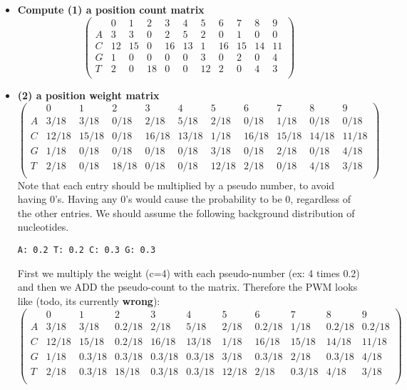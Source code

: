 \documentclass[a4paper,10pt,titlepage]{article}
\begin{document}
\begin{itemize}
\item
\textbf{Compute (1) a position count matrix} \\
\begin{equation}
  \begin{pmatrix}
	  & 0  & 1  & 2  & 3  & 4  & 5  & 6  & 7  & 8  & 9 \\
	\hline
	A & 3  & 3  & 0  & 2  & 5  & 2  & 0  & 1  & 0  & 0 \\
	C & 12 & 15 & 0  & 16 & 13 & 1  & 16 & 15 & 14 & 11\\
	G & 1  & 0  & 0  & 0  & 0  & 3  & 0  & 2  & 0  & 4 \\
	T & 2  & 0  & 18 & 0  & 0  & 12 & 2  & 0  & 4  & 3 \\
  \end{pmatrix}
\end{equation}

\item
\textbf{(2) a position weight matrix} \\
\begin{equation}
  \begin{pmatrix}
	  & 0  & 1  & 2  & 3  & 4  & 5  & 6  & 7  & 8  & 9 \\
	\hline
	A & 3/18  & 3/18  & 0/18  & 2/18  & 5/18  & 2/18  & 0/18  & 1/18  & 0/18  & 0/18 \\
	C & 12/18 & 15/18 & 0/18  & 16/18 & 13/18 & 1/18  & 16/18 & 15/18 & 14/18 & 11/18\\
	G & 1/18  & 0/18  & 0/18  & 0/18  & 0/18  & 3/18  & 0/18  & 2/18  & 0/18  & 4/18 \\
	T & 2/18  & 0/18  & 18/18 & 0/18  & 0/18  & 12/18 & 2/18  & 0/18  & 4/18  & 3/18 \\
  \end{pmatrix}
\end{equation}
Note that each entry should be multiplied by a pseudo number, to avoid having 0's. Having any 0's would cause the probability to be 0, regardless of the other entries.
We should assume the following background distribution of nucleotides.
\begin{verbatim}
A: 0.2 T: 0.2 C: 0.3 G: 0.3
\end{verbatim}
First we multiply the weight (c=4) with each pseudo-number (ex: 4 times 0.2) and then we ADD the pseudo-count to the matrix. Therefore the PWM looks like (todo, its currently \textbf{wrong}):
\begin{equation}
  \begin{pmatrix}
	  & 0  & 1  & 2  & 3  & 4  & 5  & 6  & 7  & 8  & 9 \\
	\hline
	A & 3/18  & 3/18  & 0.2/18  & 2/18  & 5/18  & 2/18  & 0.2/18  & 1/18  & 0.2/18  & 0.2/18 \\
	C & 12/18 & 15/18 & 0.2/18  & 16/18 & 13/18 & 1/18  & 16/18 & 15/18 & 14/18 & 11/18\\
	G & 1/18  & 0.3/18  & 0.3/18  & 0.3/18  & 0.3/18  & 3/18  & 0.3/18  & 2/18  & 0.3/18  & 4/18 \\
	T & 2/18  & 0.3/18  & 18/18 & 0.3/18  & 0.3/18  & 12/18 & 2/18  & 0.3/18  & 4/18  & 3/18 \\
  \end{pmatrix}
\end{equation}


\end{itemize}
\end{document}
